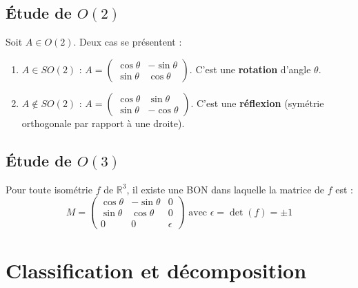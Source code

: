 \documentclass[french]{yLectureNote}
\newcommand{\R}[0]{\mathbb{R}}
\begin{document}
\subsection{Étude de $O(2)$}

Soit $A \in O(2)$. Deux cas se présentent :
\begin{enumerate}
    \item $A \in SO(2)$ : $A = \begin{pmatrix} \cos \theta & -\sin \theta \\ \sin \theta & \cos \theta \end{pmatrix}$. C'est une \textbf{rotation} d'angle $\theta$.
    \item $A \notin SO(2)$ : $A = \begin{pmatrix} \cos \theta & \sin \theta \\ \sin \theta & -\cos \theta \end{pmatrix}$. C'est une \textbf{réflexion} (symétrie orthogonale par rapport à une droite).
\end{enumerate}

\subsection{Étude de $O(3)$}

\begin{theorem}
    Pour toute isométrie $f$ de $\R^3$, il existe une BON dans laquelle la matrice de $f$ est :
    $$ M = \begin{pmatrix} \cos \theta & -\sin \theta & 0 \\ \sin \theta & \cos \theta & 0 \\ 0 & 0 & \epsilon \end{pmatrix} \text{ avec } \epsilon = \det(f) = \pm 1 $$
\end{theorem}

\section{Classification et décomposition}
\end{document}
